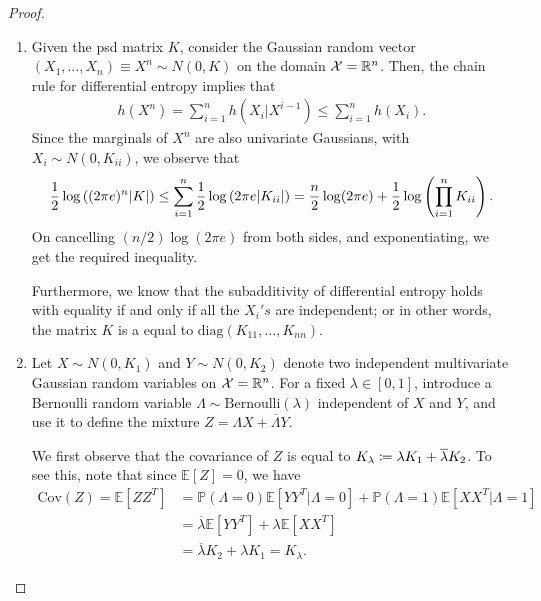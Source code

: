             \begin{proof}
                \begin{enumerate}[label=(\alph*)]
                    \item Given the psd matrix $K$, consider the Gaussian random vector $(X_1, \ldots, X_n) \equiv X^n \sim N(0, K)$ on the domain $\mathcal{X} = \mathbb{R}^n$. Then, the chain rule for differential entropy implies that 
                    \begin{align}
                        h(X^n) = \sum_{i=1}^n h(X_i|X^{i-1}) \leq \sum_{i=1}^n h(X_i). 
                    \end{align}
                    Since the marginals of $X^n$ are also univariate Gaussians, with $X_i \sim N(0, K_{ii})$, we observe that 
                    \begin{align}
                        \frac{1}{2} \log \left( (2\pi e)^n |K| \right) \leq \sum_{i=1}^n \frac{1}{2} \log \left( 2 \pi e |K_{ii}| \right)  = \frac{n}{2} \log(2\pi e) + \frac{1}{2}\log \left( \prod_{i=1}^n K_{ii} \right).  
                    \end{align}
                    On cancelling $(n/2) \log(2\pi e)$ from both sides, and exponentiating, we get the required inequality. 

                    Furthermore, we know that the subadditivity of differential entropy holds with equality if and only if all the $X_i's$ are independent; or in other words, the matrix $K$ is a equal to $\text{diag}(K_{11}, \ldots, K_{nn})$. 

                    \item Let $X \sim N(0, K_1)$ and $Y \sim N(0, K_2)$ denote two independent multivariate Gaussian random variables on $\mathcal{X} = \mathbb{R}^n$. For a fixed $\lambda \in [0,1]$, introduce a Bernoulli random variable $ \Lambda \sim \text{Bernoulli}(\lambda)$ independent of $X$ and $Y$, and use it to define the mixture $Z = \Lambda X + \overline{\Lambda}Y$. 

                    We first observe that the covariance of $Z$ is equal to $K_\lambda \coloneqq \lambda K_1 + \overline{\lambda}K_2$. To see this, note that since $\mathbb{E}[Z]= 0$, we have 
                    \begin{align}
                        \text{Cov}(Z) = \mathbb{E}[ZZ^T] &= \mathbb{P}(\Lambda = 0) \mathbb{E}[YY^T|\Lambda=0] + \mathbb{P}(\Lambda = 1) \mathbb{E}[XX^T|\Lambda=1]  \\
                        &= \overline{\lambda} \mathbb{E}[YY^T] + \lambda \mathbb{E}[XX^T] \\
                        &= \overline{\lambda} K_2 + \lambda K_1 = K_\lambda.  \label{eq:ky-fan-1}
                    \end{align}


\end{enumerate}
\end{proof}
